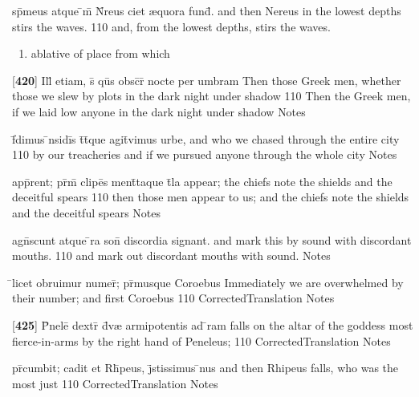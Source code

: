 \latline
  {sp\={}meus atque \={\macron {\i}}m\={} N\={}reus ciet {\ae}quora fund\={}.}
  { and then Nereus in the lowest depths stirs the waves. }
  {110}
  { and, from the lowest depths, stirs the waves. }
  { \begin{enumerate}
  	\item ablative of place from which
  \end{enumerate} }


\latline
  {[\textbf{420}] Ill\={\macron {\i}} etiam, s\={\macron {\i}} qu\={}s obsc\={}r\={} nocte per umbram}
  { Then those Greek men, whether those we slew by plots in the dark night under shadow  }
  {110}
  { Then the Greek men, if we laid low anyone in the dark night under shadow }
  { Notes }


\latline
  {f\={}dimus \={\macron {\i}}nsidi\={\macron {\i}}s t\={}t\={}que agit\={}vimus urbe,}
  { and who we chased through the entire city }
  {110}
  { by our treacheries and if we pursued anyone through the whole city }
  { Notes }


\latline
  {app\={}rent; pr\={\macron {\i}}m\={\macron {\i}} clipe\={}s ment\={\macron {\i}}taque t\={}la}
  { appear; the chiefs note the shields and the deceitful spears }
  {110}
  { then those men appear to us; and the chiefs note the shields and the deceitful spears  }
  { Notes }


\latline
  {agn\={}scunt atque \={}ra son\={} discordia signant.}
  { and mark this by sound with discordant mouths.  }
  {110}
  { and mark out discordant mouths with sound. }
  { Notes }


\latline
  {\={}licet obruimur numer\={}; pr\={\macron {\i}}musque Coroebus}
  { Immediately we are overwhelmed by their number; and first Coroebus }
  {110}
  { CorrectedTranslation }
  { Notes }


\latline
  {[\textbf{425}] P\={}nele\={\macron {\i}} dextr\={} d\={\macron {\i}}v{\ae} armipotentis ad \={}ram}
  { falls on the altar of the goddess most fierce-in-arms by the right hand of Peneleus; }
  {110}
  { CorrectedTranslation }
  { Notes }


\latline
  {pr\={}cumbit; cadit et Rh\={\macron {\i}}peus, j\={}stissimus \={}nus}
  { and then Rhipeus falls, who was the most just }
  {110}
  { CorrectedTranslation }
  { Notes }


